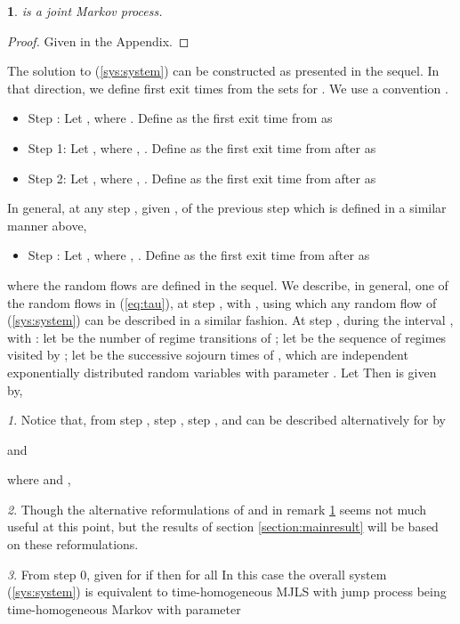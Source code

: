 \documentclass[10.5pt,a4paper]{article}
\theoremstyle{remark}
\theoremstyle{plain}
\theoremstyle{plain}
\theoremstyle{remark}
\newtheorem{rem}{\protect\remarkname}
\theoremstyle{plain}
\theoremstyle{plain}
\newtheorem{lem}{\protect\lemmaname}
\providecommand{\lemmaname}{Lemma}
\providecommand{\remarkname}{Remark}
\begin{document}
\begin{lem}
\label{lemma:joint_Markov_process} 
is a joint Markov process.\end{lem}
\begin{proof}
Given in the Appendix.
\end{proof}
The solution to (\ref{sys:system}) can be constructed as presented
in the sequel. In that direction, we define first exit times from
the sets  for . We use a convention . 
\begin{itemize}
\item Step : Let , where .
Define  as the first exit time from  as 


\item Step 1: Let , where ,
. Define  as the first exit time
from  after  as 


\item Step 2: Let , where ,
. Define  as the first exit time
from  after  as 


\end{itemize}
In general, at any step , given , 
of the previous step  which is defined in a similar manner above,
\begin{itemize}
\item Step : Let , where ,
. Define  as the first exit time
from  after  as 


\end{itemize}
where the random flows  are defined in the sequel.
We describe, in general, one of the random flows 
in (\ref{eq:tau}), at step , with ,
using which any random flow of (\ref{sys:system}) can be described
in a similar fashion. At step , during the interval ,
with : let  be the
number of regime transitions of  ; let 
be the sequence of regimes visited by ; let 
be the successive sojourn times of , which are independent
exponentially distributed random variables with parameter .
Let  Then
 is given by,



\begin{rem}
\label{rem:sigma_r_reform}Notice that, from step , step ,
 step ,  and 
can be described alternatively for  by 

and

where  and ,

\end{rem}

\begin{rem}
Though the alternative reformulations of  and 
in remark \ref{rem:sigma_r_reform} seems not much useful at this
point, but the results of section \ref{section:mainresult} will be
based on these reformulations.
\end{rem}
\begin{rem}\label{remark:gen_mjls}From step 0, given 
for  if  then 
for all  In this case the overall system (\ref{sys:system})
is equivalent to time-homogeneous MJLS with jump process being time-homogeneous
Markov with parameter \end{rem}
\end{document}
